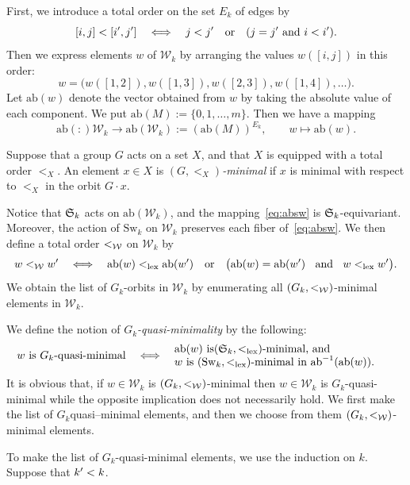 \documentclass{amsart} %
\newcommand{\Sw}{\mathrm{Sw}}
\newcommand{\Wk}{\mathcal{W}_k}
\newcommand{\abs}[1]{\mathrm{ab}(#1)}
\newcommand{\ab}{\mathrm{ab}}
\begin{document}
First, we introduce a total order on the set $E_k$ of edges by
\[
[i,j] < [i^{\prime},j^{\prime}]
\quad\Longleftrightarrow\quad
j < j^{\prime}
\quad\text{or}\quad
(j = j^{\prime} \text{ and } i < i^{\prime}).
\]
Then we express elements $w$ of $\Wk$ by arranging
the values $w([i,j])$ in this order:
\[
w = \bigl(w([1,2]), w([1,3]), w([2,3]), w([1,4]), \ldots \bigr).
\]
Let $\abs{w}$ denote the vector obtained from $w$ by taking
the absolute value of each component.
We put $\abs{M} := \{0,1,\ldots,m\}$.
Then we have a mapping
%
\begin{equation}\label{eq:absw}
\abs \colon \Wk \longrightarrow \abs{\Wk} := (\abs{M})^{E_k},
\qquad
w \longmapsto \abs{w}.
\end{equation}
%
\begin{definition}
Suppose that a group $G$ acts on a set $X$,
and that $X$ is equipped with 
a total order
 $<_{X}$.
An element $x\in X$ is \emph{$(G, <_{X})$-minimal} 
if $x$ is minimal 
with respect to $<_{X}$ in the orbit $G\cdot x$.
\end{definition}
%
Notice that $\mathord{\mathfrak{S}}_k$ acts on $\abs{\Wk}$, and the mapping~\eqref{eq:absw}
is $\mathord{\mathfrak{S}}_k$-equivariant.
Moreover, the action of $\Sw_k$ on $\Wk$ preserves
each fiber of~\eqref{eq:absw}.
We then define a total order $<_{\mathord{\mathcal{W}}}$ on $\Wk$ by
\[
w <_{\WWW} w\sprime
\quad\Longleftrightarrow\quad
\abs{w} <_{\mathrm{lex}} \abs{w\sprime}
\quad\text{or}\quad
\bigl(\abs{w} = \abs{w\sprime} \;\;\text{ and }\;\; w <_{\mathrm{lex}} w\sprime\bigr).
\]
We obtain the list of $G_k$-orbits in $\Wk$
by enumerating all $(G_k, <_{\mathord{\mathcal{W}}} )$-minimal elements in $\Wk$.
\par
We define the notion of  
 \emph{$G_k$-quasi-minimality}
by the following:
\[
\text{$w$ is $G_k\text{-quasi-minimal}$}
\quad\Longleftrightarrow\quad
\parbox{7cm}{
$\abs{w}$ is$(\SSSS_k, <_{\mathrm{lex}})$-minimal, and  \\ 
$w$  is $(\Sw_k, <_{\mathrm{lex}})$-minimal   in  $\ab\inv(\ab(w))$.}
\]
%
It is obvious that, if  $w \in \Wk$ is $(G_k, <_{\mathord{\mathcal{W}}} )$-minimal then  $w \in \Wk$ is $G_k$-quasi-minimal
while the opposite implication does not necessarily hold.
We first make the list of $G_k$quasi--minimal elements,
and then we choose from them $(G_k, <_{\mathord{\mathcal{W}}} )$-minimal elements.
\par
To make the list of $G_k$-quasi-minimal elements,
we use the induction on $k$.
Suppose that $k^{\prime} < k$.
\end{document}
